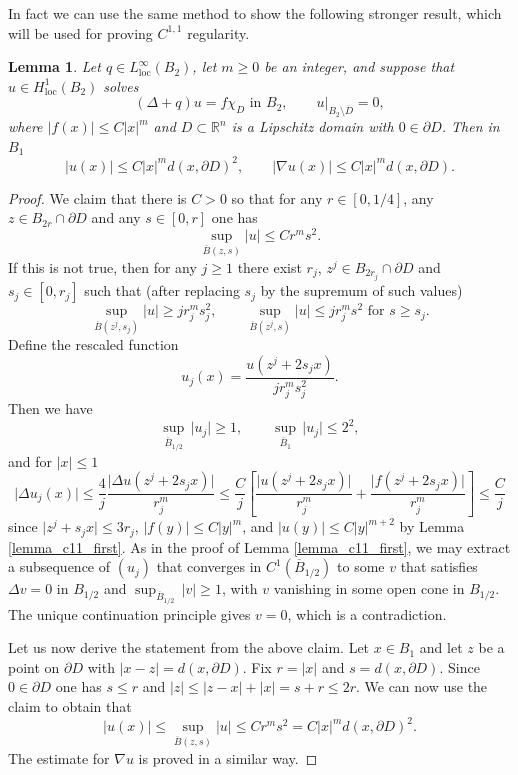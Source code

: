 \documentclass[11pt,a4paper]{amsart}
\newtheorem{Lemma}[Theorem]{Lemma}
\theoremstyle{definition}
\numberwithin{equation}{section}
\newcommand{\mR}{\mathbb{R}}                    %
\newcommand{\abs}[1]{\lvert #1 \rvert}          %
\newcommand{\ol}[1]{\overline{#1}}
\newcommand{\p}{\partial}
\begin{document}
In fact we can use the same method to show the following stronger result, which will be used for proving $C^{1,1}$ regularity.


\begin{Lemma} \label{lemma_c11_second}
Let $q \in L^{\infty}_{\mathrm{loc}}(B_2)$, let $m \geq 0$ be an integer, and suppose that $u \in H^1_{\mathrm{loc}}(B_2)$ solves 
\[
(\Delta + q)u = f \chi_D \text{ in $B_2$}, \qquad u|_{B_2 \setminus \ol{D}} = 0,
\]
where $\abs{f(x)} \leq C \abs{x}^m$ and $D \subset \mR^n$ is a Lipschitz domain with $0 \in \p D$. Then in $B_1$ 
\[
\abs{u(x)} \leq C \abs{x}^{m} d(x, \p D)^2, \qquad \abs{\nabla u(x)} \leq C \abs{x}^{m} d(x, \p D).
\]
\end{Lemma}
\begin{proof}
We claim that there is $C > 0$ so that for any $r \in [0,1/4]$, any $z \in B_{2r} \cap \p D$ and any $s \in [0,r]$ one has 
\[
\sup_{\ol{B}(z,s)} \abs{u} \leq C r^m s^2.
\]
If this is not true, then for any $j \geq 1$ there exist $r_j$, $z^j \in B_{2r_j} \cap \p D$ and $s_j \in [0,r_j]$ such that (after replacing $s_j$ by the supremum of such values) 
\[
\sup_{\ol{B}(z^j, s_j)} \abs{u} \geq j r_j^m s_j^2, \qquad \sup_{\ol{B}(z^j, s)} \abs{u} \leq j r_j^m s^2 \text{ for $s \geq s_j$.}
\]
Define the rescaled function 
\[
u_j(x) = \frac{u(z^j + 2 s_j x)}{j r_j^m s_j^2}.
\]
Then we have 
\[
\sup_{\ol{B}_{1/2}} \,\abs{u_j} \geq 1, \qquad \sup_{\ol{B}_{1}} \,\abs{u_j} \leq 2^2,
\]
and for $\abs{x} \leq 1$ 
\[
\abs{\Delta u_j(x)} \leq \frac{4}{j} \frac{\abs{\Delta u(z^j + 2 s_j x)}}{r_j^m} \leq \frac{C}{j} \left[ \frac{\abs{u(z^j + 2 s_j x)}}{r_j^m} + \frac{\abs{f(z^j + 2 s_j x)}}{r_j^m} \right] \leq \frac{C}{j}
\]
since $\abs{z^j + s_j x} \leq 3 r_j$, $\abs{f(y)} \leq C \abs{y}^m$, and $\abs{u(y)} \leq C \abs{y}^{m+2}$ by Lemma \ref{lemma_c11_first}. As in the proof of Lemma \ref{lemma_c11_first}, we may extract a subsequence of $(u_j)$ that converges in $C^1(\ol{B}_{1/2})$ to some $v$ that satisfies $\Delta v = 0$ in $B_{1/2}$ and $\sup_{\ol{B}_{1/2}} \,\abs{v} \geq 1$, with $v$ vanishing in some open cone in $B_{1/2}$. The unique continuation principle gives $v = 0$, which is a contradiction.

Let us now derive the statement from the above claim. Let $x \in B_1$ and let $z$ be a point on $\p D$ with $\abs{x-z} = d(x, \p D)$. Fix $r = \abs{x}$ and $s = d(x, \p D)$. Since $0 \in \p D$ one has $s \leq r$ and  $\abs{z} \leq \abs{z-x} + \abs{x} = s + r \leq 2r$. We can now use the claim to obtain that 
\[
\abs{u(x)} \leq \sup_{\ol{B}(z,s)} \abs{u} \leq C r^m s^2 = C \abs{x}^m d(x, \p D)^2.
\]
The estimate for $\nabla u$ is proved in a similar way.
\end{proof}
\end{document}
